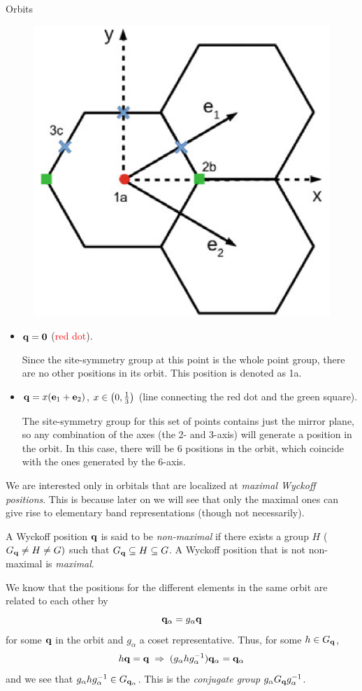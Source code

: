 \documentclass[10pt,aspectratio=169,xcolor={table,dvipsnames}]{beamer}
\begin{document}
\begin{frame}{Orbits}
\begin{figure}[H]
\centering
\includegraphics[width=0.22\linewidth]{fig/wyckoff_pos.png}
\end{figure}

\begin{itemize}
\item ${\vb{q}} = {\vb{0}}$ (\textcolor{red}{red dot}).

Since the site-symmetry group at this point is the whole point group, there are no other positions in its orbit. This position is denoted as 1a.

\n

\item ${\vb{q}} = x({\vb{e}}_1+{\vb{e}}_2)$, $x \in \qty(0, \frac{1}{3})$ (line connecting the red dot and the green square).

The site-symmetry group for this set of points contains just the mirror plane, so any combination of the axes (the 2- and 3-axis) will generate a position in the orbit. In this case, there will be 6 positions in the orbit, which coincide with the ones generated by the 6-axis.
\end{itemize}
\end{frame}

\begin{frame}

We are interested only in orbitals that are localized at \textit{maximal Wyckoff positions}. This is because later on we will see that only the maximal ones can give rise to elementary band representations (though not necessarily).

\begin{definition}
A Wyckoff position ${\vb{q}}$ is said to be \textit{non-maximal} if there exists a group $H$ ($G_{\vb{q}} \neq H \neq G)$ such that $G_{\vb{q}} \subseteq H \subseteq G$. A Wyckoff position that is not non-maximal is \textit{maximal}.
\end{definition}

\n

We know that the positions for the different elements in the same orbit are related to each other by
$$
{\vb{q}}_\alpha = g_\alpha {\vb{q}}
$$
for some ${\vb{q}}$ in the orbit and $g_\alpha$ a coset representative. Thus, for some $h \in G_{\vb{q}}$,
$$
h{\vb{q}} = {\vb{q}} \; \Rightarrow \; (g_\alpha h g_\alpha^{-1}) {\vb{q}}_\alpha = {\vb{q}}_\alpha
$$
and we see that $g_\alpha h g_\alpha^{-1} \in G_{{\vb{q}}_\alpha}$. This is the \textit{conjugate group} $g_\alpha G_{\vb{q}} g_\alpha^{-1}$.
\end{frame}
\end{document}
